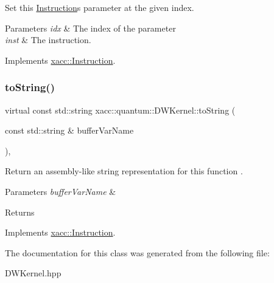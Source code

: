 Set this \hyperlink{a01657}{Instruction}\textquotesingle{}s parameter at the given index.


\begin{DoxyParams}{Parameters}
{\em idx} & The index of the parameter \\
\hline
{\em inst} & The instruction. \\
\hline
\end{DoxyParams}


Implements \hyperlink{a01657_a407a0ac662fa0b1ec3e301e8ff9bade7}{xacc\+::\+Instruction}.

\mbox{\label{a01221_adbc3fdd080ebba20bc620b8832979f16}} 
\subsubsection{\texorpdfstring{to\+String()}{toString()}}
{\footnotesize\ttfamily virtual const std\+::string xacc\+::quantum\+::\+D\+W\+Kernel\+::to\+String (\begin{DoxyParamCaption}\item[{const std\+::string \&}]{buffer\+Var\+Name }\end{DoxyParamCaption})\hspace{0.3cm}{\ttfamily [inline]}, {\ttfamily [virtual]}}

Return an assembly-\/like string representation for this function . 
\begin{DoxyParams}{Parameters}
{\em buffer\+Var\+Name} & \\
\hline
\end{DoxyParams}
\begin{DoxyReturn}{Returns}

\end{DoxyReturn}


Implements \hyperlink{a01657_ae94c2d089908294c1d410b14c96817ae}{xacc\+::\+Instruction}.



The documentation for this class was generated from the following file\+:\begin{DoxyCompactItemize}
\item 
D\+W\+Kernel.\+hpp\end{DoxyCompactItemize}
